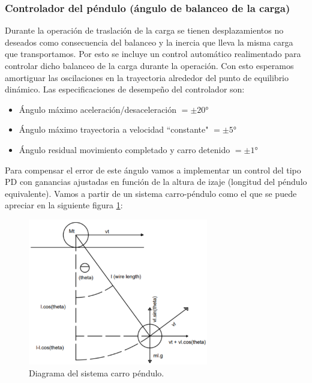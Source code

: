 \documentclass[11pt]{article}
\begin{document}
\subsubsection{Controlador del péndulo (ángulo de balanceo de la carga)}

Durante la operación de traslación de la carga se tienen desplazamientos no deseados como consecuencia del balanceo y la inercia que lleva la misma carga que transportamos. Por esto se incluye un control automático realimentado para controlar dicho balanceo de la carga durante la operación. Con esto esperamos amortiguar las oscilaciones en la trayectoria alrededor del punto de equilibrio dinámico. Las especificaciones de desempeño del controlador son:

\begin{itemize}
	\item Ángulo máximo aceleración/desaceleración $=\pm 20°$
	\item Ángulo máximo trayectoria a velocidad ``constante" $=\pm 5°$
	\item Ángulo residual movimiento completado y carro detenido $=\pm 1°$
\end{itemize}

Para compensar el error de este ángulo vamos a implementar un control del tipo PD con ganancias ajustadas en función de la altura de izaje (longitud del péndulo equivalente). Vamos a partir de un sistema carro-péndulo como el que se puede apreciar en la siguiente figura \ref{fig:sistema_carro_pendulo}:

\begin{figure}[h!]
	\centering
	\includegraphics[width=0.7\textwidth]{images/imagen_14_sistema_carro_pendulo.png}
	\caption{Diagrama del sistema carro péndulo.}
	\label{fig:sistema_carro_pendulo}
\end{figure}
\end{document}
